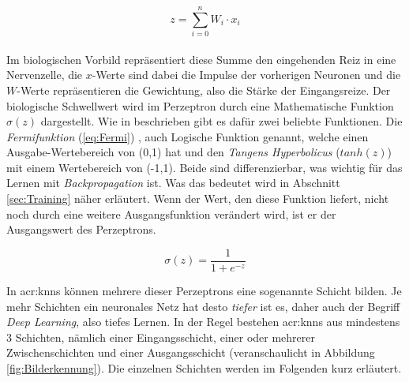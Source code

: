 \begin{equation}
z = \sum \limits_{i=0}^{n} W_i \cdot x_i
\end{equation}\\

Im biologischen Vorbild repräsentiert diese Summe den eingehenden Reiz in eine Nervenzelle, die \(x\)-Werte sind dabei die Impulse der vorherigen Neuronen und die \(W\)-Werte repräsentieren die Gewichtung, also die Stärke der Eingangsreize. Der biologische Schwellwert wird im Perzeptron durch eine Mathematische Funktion \(\sigma(z)\) dargestellt. Wie in \cite{bib:UebereblickNN} beschrieben gibt es dafür zwei beliebte Funktionen. Die \textit{Fermifunktion} (\ref{eq:Fermi}) , auch Logische Funktion genannt, welche einen Ausgabe-Wertebereich von (0,1) hat und den \textit{Tangens Hyperbolicus} (\(tanh(z)\)) mit einem Wertebereich von (-1,1). Beide sind differenzierbar, was wichtig für das Lernen mit \textit{Backpropagation} ist. Was das bedeutet wird in Abschnitt \ref{sec:Training} näher erläutert. Wenn der Wert, den diese Funktion liefert, nicht noch durch eine weitere Ausgangsfunktion verändert wird, ist er der Ausgangswert des Perzeptrons.

\begin{equation}
\sigma(z) = \frac{1}{1 + e^{-z}}
\label{eq:Fermi}
\end{equation}

In \acrshort{acr:knn}s können mehrere dieser Perzeptrons eine sogenannte Schicht bilden. Je mehr Schichten ein neuronales Netz hat desto \textit{tiefer} ist es, daher auch der Begriff \textit{Deep Learning}, also tiefes Lernen. In der Regel bestehen \acrshort{acr:knn}s aus mindestens 3 Schichten, nämlich einer Eingangsschicht, einer oder mehrerer Zwischenschichten und einer Ausgangsschicht (veranschaulicht in Abbildung \ref{fig:Bilderkennung}). Die einzelnen Schichten werden im Folgenden kurz erläutert.  

